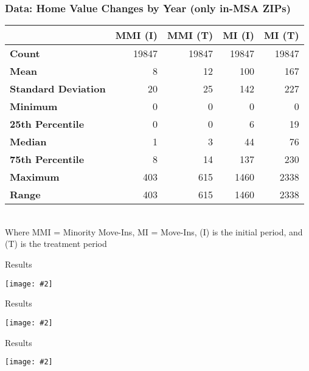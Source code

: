 \documentclass[aspectratio=169]{beamer}
\newcommand {\framedgraphic}[2] {
    \begin{frame}{#1}
        \begin{center}
            \texttt{[image: \#2]}
        \end{center}
    \end{frame}
}
\begin{document}
\begin{frame}
\frametitle{Data: Home Value Changes by Year (only in-MSA ZIPs)}
\begin{table}[H]
    \centering
    \begin{tabular}{l|rrrr}
    \toprule
    & \textbf{MMI (I)} & \textbf{MMI (T)} & \textbf{MI (I)} & \textbf{MI (T)} \\
    \midrule
    \textbf{Count} & 19847 & 19847 & 19847 & 19847 \\
    \textbf{Mean} & 8 & 12 & 100 & 167 \\
    \textbf{Standard Deviation} & 20 & 25 & 142 & 227 \\
    \textbf{Minimum} & 0 & 0 & 0 & 0 \\
    \textbf{25th Percentile} & 0 & 0 & 6 & 19 \\
    \textbf{Median} & 1 & 3 & 44 & 76 \\
    \textbf{75th Percentile} & 8 & 14 & 137 & 230 \\
    \textbf{Maximum} & 403 & 615 & 1460 & 2338 \\
    \textbf{Range} & 403 & 615 & 1460 & 2338 \\
    \bottomrule
    \end{tabular}\\
    Where MMI = Minority Move-Ins, MI = Move-Ins, (I) is the initial period, and (T) is the treatment period
\end{table}
\end{frame}
\framedgraphic{Results}{../../project_files/project_54_1.png}
\framedgraphic{Results}{../../project_files/project_61_1.png}
\framedgraphic{Results}{../../project_files/project_76_0.png}
\end{document}
